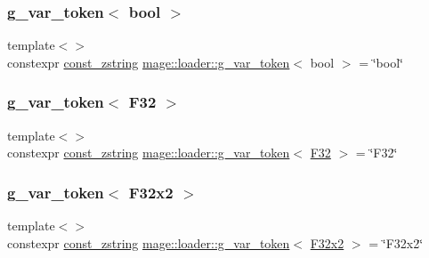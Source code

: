 \mbox{\label{namespacemage_1_1loader_a9cd6293d10a4878b3cb6947501c4fea6}} 
\subsubsection{\texorpdfstring{g\+\_\+var\+\_\+token$<$ bool $>$}{g\_var\_token< bool >}}
{\footnotesize\ttfamily template$<$$>$ \\
constexpr \mbox{\hyperlink{namespacemage_abfd9206dc607ceb5d13ec68bf075a5c0}{const\+\_\+zstring}} \mbox{\hyperlink{namespacemage_1_1loader_af955278eb72ed57ce15bc79d4d074b3a}{mage\+::loader\+::g\+\_\+var\+\_\+token}}$<$ bool $>$ = \char`\"{}bool\char`\"{}}

\mbox{\label{namespacemage_1_1loader_ac4d75ba515c1934351afc66e069606a7}} 
\subsubsection{\texorpdfstring{g\+\_\+var\+\_\+token$<$ F32 $>$}{g\_var\_token< F32 >}}
{\footnotesize\ttfamily template$<$$>$ \\
constexpr \mbox{\hyperlink{namespacemage_abfd9206dc607ceb5d13ec68bf075a5c0}{const\+\_\+zstring}} \mbox{\hyperlink{namespacemage_1_1loader_af955278eb72ed57ce15bc79d4d074b3a}{mage\+::loader\+::g\+\_\+var\+\_\+token}}$<$ \mbox{\hyperlink{namespacemage_aa97e833b45f06d60a0a9c4fc22ae02c0}{F32}} $>$ = \char`\"{}F32\char`\"{}}

\mbox{\label{namespacemage_1_1loader_af56b628989892c30ef0ce2c616bd424f}} 
\subsubsection{\texorpdfstring{g\+\_\+var\+\_\+token$<$ F32x2 $>$}{g\_var\_token< F32x2 >}}
{\footnotesize\ttfamily template$<$$>$ \\
constexpr \mbox{\hyperlink{namespacemage_abfd9206dc607ceb5d13ec68bf075a5c0}{const\+\_\+zstring}} \mbox{\hyperlink{namespacemage_1_1loader_af955278eb72ed57ce15bc79d4d074b3a}{mage\+::loader\+::g\+\_\+var\+\_\+token}}$<$ \mbox{\hyperlink{namespacemage_aee4759dedc8def6c6dec26b5c7eddf29}{F32x2}} $>$ = \char`\"{}F32x2\char`\"{}}

